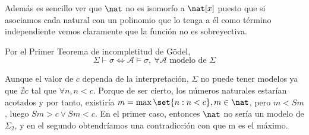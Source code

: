 \begin{problem}
Además es sencillo ver que $\nat$ no es isomorfo a $\nat[x]$ puesto que si asociamos cada natural con un polinomio que lo tenga a él como término independiente vemos claramente que la función no es sobreyectiva.

\spart

Por el Primer Teorema de incompletitud de Gödel,
\[ \Sigma \vdash \sigma \iff \mathcal{A} \models \sigma, \ \forall \mathcal{A} \text{ modelo de } \Sigma\]

Aunque el valor de $c$ dependa de la interpretación, $\Sigma$ no puede tener modelos ya que $\nexists c $ tal que $\forall n, n < c$. Porque de ser cierto, los números naturales estarían acotados y por tanto, existiría $m = \max\set{ n : n < c}, m \in \nat$, pero $m < Sm$, luego $Sm > c \lor Sm < c$. En el primer caso, entonces $\nat$ no sería un modelo de $\Sigma_2$, y en el segundo obtendríamos una contradicción con que m es el máximo.

\end{problem}
